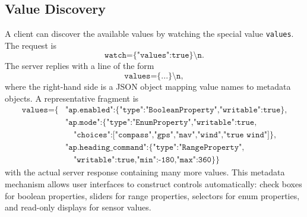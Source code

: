 \documentclass[10pt,twocolumn]{article}
\begin{document}
\subsection{Value Discovery}
A client can discover the available values by watching the special value
\texttt{values}.  The request is
\[
\texttt{watch=\{"values":true\}\textbackslash n}.
\]
The server replies with a line of the form
\[
\texttt{values=\{...\}\textbackslash n},
\]
where the right-hand side is a JSON object mapping value names to metadata
objects.  A representative fragment is
{\scriptsize
\[
\begin{aligned}
\texttt{values=\{}&
\texttt{"ap.enabled":\{"type":"BooleanProperty","writable":true\},}\\
&
\texttt{"ap.mode":\{"type":"EnumProperty","writable":true,}\\
&\quad
\texttt{"choices":["compass","gps","nav","wind","true wind"]\},}\\
&
\texttt{"ap.heading\_command":\{"type":"RangeProperty",}\\
&\quad
\texttt{"writable":true,"min":-180,"max":360\}\}}
\end{aligned}
\]
}
with the actual server response containing many more values.  This
metadata mechanism allows user interfaces to construct controls
automatically: check boxes for boolean properties, sliders for range
properties, selectors for enum properties, and read-only displays for
sensor values.
\end{document}
